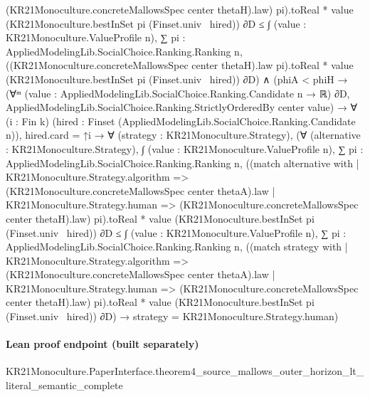 \documentclass[10pt]{article}
\begin{document}
\begin{ReviewVerbatim}
                                  (KR21Monoculture.concreteMallowsSpec center thetaH).law)
                                pi).toReal *
                            value (KR21Monoculture.bestInSet pi (Finset.univ \ hired)) ∂D ≤
                      ∫ (value : KR21Monoculture.ValueProfile n),
                        ∑ pi : AppliedModelingLib.SocialChoice.Ranking.Ranking n,
                          ((KR21Monoculture.concreteMallowsSpec center thetaH).law pi).toReal *
                            value (KR21Monoculture.bestInSet pi (Finset.univ \ hired)) ∂D) ∧
          (phiA < phiH →
            (∀ᵐ (value : AppliedModelingLib.SocialChoice.Ranking.Candidate n → ℝ) ∂D,
                AppliedModelingLib.SocialChoice.Ranking.StrictlyOrderedBy center value) →
              ∀ (i : Fin k) (hired : Finset (AppliedModelingLib.SocialChoice.Ranking.Candidate n)),
                hired.card = ↑i →
                  ∀ (strategy : KR21Monoculture.Strategy),
                    (∀ (alternative : KR21Monoculture.Strategy),
                        ∫ (value : KR21Monoculture.ValueProfile n),
                            ∑ pi : AppliedModelingLib.SocialChoice.Ranking.Ranking n,
                              ((match alternative with
                                    | KR21Monoculture.Strategy.algorithm =>
                                      (KR21Monoculture.concreteMallowsSpec center thetaA).law
                                    | KR21Monoculture.Strategy.human =>
                                      (KR21Monoculture.concreteMallowsSpec center thetaH).law)
                                    pi).toReal *
                                value (KR21Monoculture.bestInSet pi (Finset.univ \ hired)) ∂D ≤
                          ∫ (value : KR21Monoculture.ValueProfile n),
                            ∑ pi : AppliedModelingLib.SocialChoice.Ranking.Ranking n,
                              ((match strategy with
                                    | KR21Monoculture.Strategy.algorithm =>
                                      (KR21Monoculture.concreteMallowsSpec center thetaA).law
                                    | KR21Monoculture.Strategy.human =>
                                      (KR21Monoculture.concreteMallowsSpec center thetaH).law)
                                    pi).toReal *
                                value (KR21Monoculture.bestInSet pi (Finset.univ \ hired)) ∂D) →
                      strategy = KR21Monoculture.Strategy.human)
\end{ReviewVerbatim}

\paragraph{Lean proof endpoint (built separately)}\begin{ReviewVerbatim}
KR21Monoculture.PaperInterface.theorem4_source_mallows_outer_horizon_lt_literal_semantic_complete
\end{ReviewVerbatim}
\end{document}
